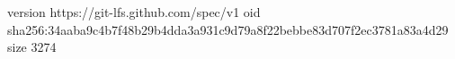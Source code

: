 version https://git-lfs.github.com/spec/v1
oid sha256:34aaba9c4b7f48b29b4dda3a931c9d79a8f22bebbe83d707f2ec3781a83a4d29
size 3274
